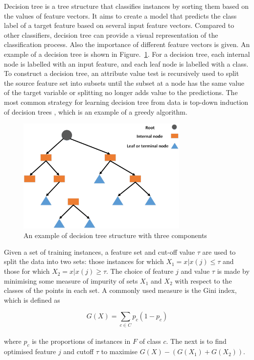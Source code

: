 Decision tree is a tree structure that classifies instances by sorting them based on the values of feature vectors. It aims to create a model that predicts the class label of a target feature based on several input feature vectors.  Compared to other classifiers, decision tree can provide a visual representation of the classification process. Also the importance of different feature vectors is given. An example of a decision tree is shown in Figure.~\ref{fig:DT}.  For a decision tree, each internal node is labelled with an input feature, and each leaf node is labelled with a class. To construct a decision tree, an attribute value test is recursively used to split the source feature set into subsets until the subset at a node has the same value of the target variable or splitting no longer adds value to the predictions. The most common strategy for learning decision tree from data is top-down induction of decision trees \citep{quinlan1986induction}, which is an example of a greedy algorithm. 
 

\begin{figure}[htb!]
\centering
\includegraphics[width=0.75\textwidth]{image/Method/DT.png}
\caption[A DT classifier]{An example of decision tree structure with three components}
\label{fig:DT}
\end{figure}



Given a set of training instances, a feature set and cut-off value $\tau$ are used to split the data into two sets: those instances for which $X_{1}={x|x(j) \leq \tau}$ and those for which $X_{2}={x|x(j) \geq \tau}$. The choice of feature $j$ and value $\tau$ is made by minimising some measure of impurity of sets $X_{1}$ and $X_{2}$ with respect to the classes of the points in each set. A commonly used measure is the Gini index, which is defined as 

\begin{equation}
G(X)=\sum_{c \in C}p_{c}(1-p_{c})
\end{equation}
\\
where $p_{c}$ is the proportions of instances in $F$ of class $c$. The next is to find optimised feature $j$ and cutoff $\tau$ to maximise 
$G(X)-(G(X_1 )+G(X_2))$. 

